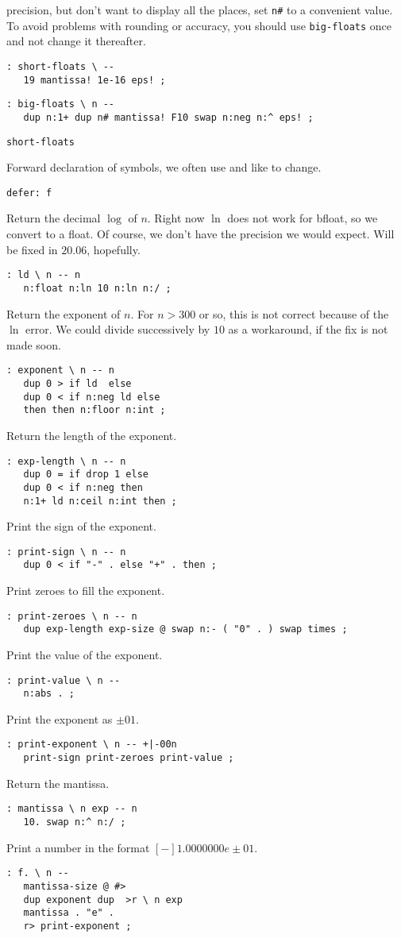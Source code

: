 \documentclass{article}
\begin{document}
precision, but don't want to display all the places, set \texttt{n\#}
to a convenient value. To avoid problems with rounding or accuracy,
you should use \texttt{big-floats} once and not change it thereafter.
\begin{verbatim}
: short-floats \ --
   19 mantissa! 1e-16 eps! ;
\end{verbatim}
\begin{verbatim}
: big-floats \ n --
   dup n:1+ dup n# mantissa! F10 swap n:neg n:^ eps! ;
\end{verbatim}
\begin{verbatim}
short-floats
\end{verbatim}
Forward declaration of symbols, we often use and like to change.
\begin{verbatim}
defer: f
\end{verbatim}
Return the decimal $\log$ of $n$. Right now $\ln$ does not work for bfloat, 
so we convert to a float. Of course, we don't have the precision we would
expect. Will be fixed in $20.06$, hopefully.
\begin{verbatim}
: ld \ n -- n
   n:float n:ln 10 n:ln n:/ ;
\end{verbatim}
Return the exponent of $n$. For $n > 300$ or so, this is not 
correct because of the $\ln$ error. We could divide successively by $10$ as a
workaround, if the fix is not made soon.
\begin{verbatim}
: exponent \ n -- n
   dup 0 > if ld  else
   dup 0 < if n:neg ld else
   then then n:floor n:int ;
\end{verbatim}
Return the length of the exponent.
\begin{verbatim}
: exp-length \ n -- n
   dup 0 = if drop 1 else 
   dup 0 < if n:neg then 
   n:1+ ld n:ceil n:int then ;
\end{verbatim}
Print the sign of the exponent.
\begin{verbatim}
: print-sign \ n -- n
   dup 0 < if "-" . else "+" . then ;
\end{verbatim}
Print zeroes to fill the exponent.
\begin{verbatim}
: print-zeroes \ n -- n
   dup exp-length exp-size @ swap n:- ( "0" . ) swap times ;
\end{verbatim}
Print the value of the exponent.   
\begin{verbatim}
: print-value \ n --
   n:abs . ;
\end{verbatim}
Print the exponent as $\pm01$.
\begin{verbatim}
: print-exponent \ n -- +|-00n
   print-sign print-zeroes print-value ;
\end{verbatim}
Return the mantissa.
\begin{verbatim}
: mantissa \ n exp -- n
   10. swap n:^ n:/ ; 
\end{verbatim}
Print a number in the format $[-]1.0000000e\pm01$.
\begin{verbatim}
: f. \ n --
   mantissa-size @ #>
   dup exponent dup  >r \ n exp
   mantissa . "e" . 
   r> print-exponent ;
\end{verbatim}
\begin{verbatim}
   
\end{verbatim}
\end{document}
